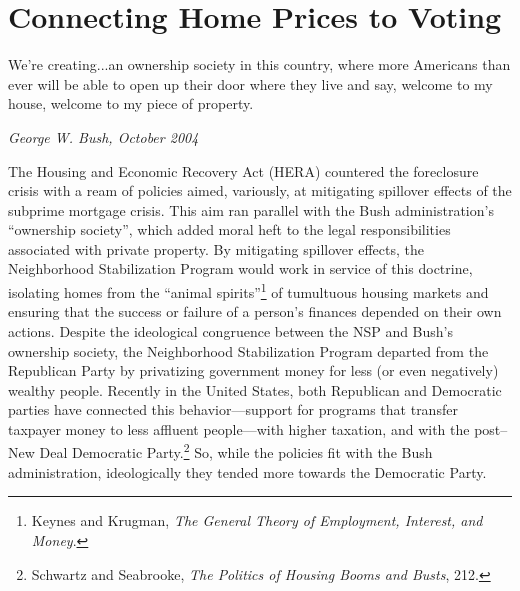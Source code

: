 \documentclass[12pt,oneside]{psthesis}
\begin{document}
\hypertarget{motive-opportunity}{%
\chapter{Connecting Home Prices to Voting}\label{motive-opportunity}}

\epigraph{We're creating...an ownership society in this country, where more Americans than ever will be able to open up their door where they live and say, welcome to my house, welcome to my piece of property.}{\textit{George W. Bush, October 2004}}

The Housing and Economic Recovery Act (HERA) countered the foreclosure crisis with a ream of policies aimed, variously, at mitigating spillover effects of the subprime mortgage crisis.
This aim ran parallel with the Bush administration's ``ownership society'', which added moral heft to the legal responsibilities associated with private property.
By mitigating spillover effects, the Neighborhood Stabilization Program would work in service of this doctrine, isolating homes from the ``animal spirits''\footnote{Keynes and Krugman, \emph{The General Theory of Employment, Interest, and Money}.} of tumultuous housing markets and ensuring that the success or failure of a person's finances depended on their own actions.
Despite the ideological congruence between the NSP and Bush's ownership society, the Neighborhood Stabilization Program departed from the Republican Party by privatizing government money for less (or even negatively) wealthy people.
Recently in the United States, both Republican and Democratic parties have connected this behavior---support for programs that transfer taxpayer money to less affluent people---with higher taxation, and with the post--New Deal Democratic Party.\footnote{Schwartz and Seabrooke, \emph{The Politics of Housing Booms and Busts}, 212.}
So, while the policies fit with the Bush administration, ideologically they tended more towards the Democratic Party.
\end{document}
